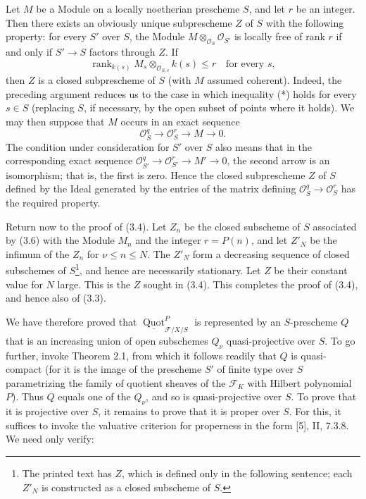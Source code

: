 Let $M$ be a Module on a locally noetherian prescheme $S$,
and let $r$ be an integer. Then there exists an obviously unique subprescheme
$Z$ of $S$ with the following property: for every $S'$ over $S$, the Module
$M\otimes_{\mathcal O_S}\mathcal O_{S'}$ is locally free of rank $r$ if and
only if $S'\longrightarrow S$ factors through $Z$. If
\[
\operatorname{rank}_{k(s)}
M_s\otimes_{\mathcal O_{S,s}}k(s)\leq r
\quad\text{for every $s$},
\]
then $Z$ is a closed subprescheme of $S$ (with $M$ assumed coherent).
Indeed, the preceding argument reduces us to the case in which inequality (*)
holds for every $s\in S$ (replacing $S$, if necessary, by the open subset of
points where it holds). We may then suppose that $M$ occurs in an exact
sequence
\[
\mathcal O_S^q\longrightarrow\mathcal O_S^r\longrightarrow M\longrightarrow0.
\]
The condition under consideration for $S'$ over $S$ also means that in the
corresponding exact sequence
$\mathcal O_{S'}^q\longrightarrow\mathcal O_{S'}^r
\longrightarrow M'\longrightarrow0$, the second arrow is an isomorphism; that
is, the first is zero. Hence the closed subprescheme $Z$ of $S$ defined by the
Ideal generated by the entries of the matrix defining
$\mathcal O_S^q\longrightarrow\mathcal O_S^r$ has the required property.

Return now to the proof of (3.4). Let $Z_n$ be the closed subscheme of $S$
associated by (3.6) with the Module $M_n$ and the integer $r=P(n)$, and let
$Z'_N$ be the infimum of the $Z_n$ for $\nu\leq n\leq N$. The $Z'_N$ form a
decreasing sequence of closed subschemes of $S$\footnote{The printed text has $Z$, which is defined only in the following sentence; each $Z'_N$ is constructed as a closed subscheme of $S$.}, and hence are necessarily
stationary. Let $Z$ be their constant value for $N$ large. This is the $Z$
sought in (3.4). This completes the proof of (3.4), and hence also of (3.3).

We have therefore proved that
$\underline{\operatorname{Quot}}^P_{\mathcal F/X/S}$ is represented by an
$S$-prescheme $Q$ that is an increasing union of open subschemes $Q_\nu$
quasi-projective over $S$. To go further, invoke Theorem 2.1, from which it
follows readily that $Q$ is quasi-compact (for it is the image of the
prescheme $S'$ of finite type over $S$ parametrizing the family of quotient
sheaves of the $\mathcal F_K$ with Hilbert polynomial $P$). Thus $Q$ equals one
of the $Q_\nu$, and so is quasi-projective over $S$. To prove that it is
projective over $S$, it remains to prove that it is proper over $S$. For this,
it suffices to invoke the valuative criterion for properness in the form [5],
II, 7.3.8. We need only verify:

